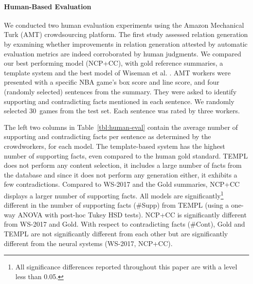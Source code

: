 \documentclass[letterpaper]{article} \usepackage{aaai19}  \usepackage{times}  \usepackage{helvet}  \usepackage{courier}  \usepackage{url}  \usepackage{graphicx}  \frenchspacing  \setlength{\pdfpagewidth}{8.5in}  \setlength{\pdfpageheight}{11in}  \graphicspath{ {images/} }
\begin{document}
\paragraph{Human-Based Evaluation}
We conducted two human evaluation experiments using the Amazon
Mechanical Turk (AMT) crowdsourcing platform. The first study assessed
relation generation by examining whether improvements in relation
generation attested by automatic evaluation metrics are indeed
corroborated by human judgments.  We compared our best performing
model (NCP+CC), with gold reference summaries, a template system and
the best model of Wiseman et
al. . AMT workers were presented with
a specific NBA game's box score and line score, and four (randomly
selected) sentences from the summary. They were asked to identify
supporting and contradicting facts mentioned in each sentence. We
randomly selected 30~games from the test set. Each sentence was rated
by three workers.




The left two columns in Table~\ref{tbl:human-eval} contain the average
number of supporting and contradicting facts per sentence as
determined by the crowdworkers, for each model.  The template-based
system has the highest number of supporting facts, even compared to
the human gold standard. TEMPL does not perform any content selection,
it includes a large number of facts from the database and since it
does not perform any generation either, it exhibits a few
contradictions.  Compared to WS-2017 and the Gold summaries, NCP+CC
displays a larger number of supporting facts. All models are
significantly\footnote{All significance differences reported
  throughout this paper are with a level less than 0.05.}  different
in the number of supporting facts (\#Supp) from TEMPL (using a one-way
ANOVA with post-hoc Tukey HSD tests). NCP+CC is significantly
different from WS-2017 and Gold.  With respect to contradicting facts
(\#Cont), Gold and TEMPL are not significantly different from each
other but are significantly different from the neural systems
(WS-2017, NCP+CC). 
\end{document}
